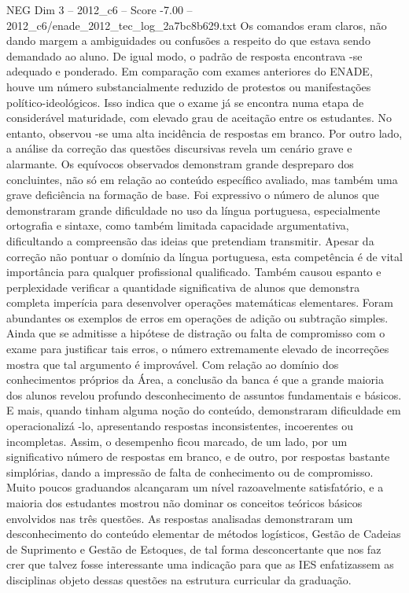 \begin{textsample}{NEG Dim 3 – 2012\_c6 – Score -7.00 – 2012\_c6/enade\_2012\_tec\_log\_2a7bc8b629.txt}
Os comandos eram claros, não dando margem a ambiguidades ou confusões a respeito do que estava sendo demandado ao aluno.
De igual modo, o padrão de resposta encontrava -se adequado e ponderado.
Em comparação com exames anteriores do ENADE, houve um número substancialmente reduzido de protestos ou manifestações político-ideológicos.
Isso indica que o exame já se encontra numa etapa de considerável maturidade, com elevado grau de aceitação entre os estudantes.
No entanto, observou -se uma alta incidência de respostas em branco.
Por outro lado, a análise da correção das questões discursivas revela um cenário grave e alarmante.
Os equívocos observados demonstram grande despreparo dos concluintes, não só em relação ao conteúdo específico avaliado, mas também uma grave deficiência na formação de base.
Foi expressivo o número de alunos que demonstraram grande dificuldade no uso da língua portuguesa, especialmente ortografia e sintaxe, como também limitada capacidade argumentativa, dificultando a compreensão das ideias que pretendiam transmitir.
Apesar da correção não pontuar o domínio da língua portuguesa, esta competência é de vital importância para qualquer profissional qualificado.
Também causou espanto e perplexidade verificar a quantidade significativa de alunos que demonstra completa imperícia para desenvolver operações matemáticas elementares.
Foram abundantes os exemplos de erros em operações de adição ou subtração simples.
Ainda que se admitisse a hipótese de distração ou falta de compromisso com o exame para justificar tais erros, o número extremamente elevado de incorreções mostra que tal argumento é improvável.
Com relação ao domínio dos conhecimentos próprios da Área, a conclusão da banca é que a grande maioria dos alunos revelou profundo desconhecimento de assuntos fundamentais e básicos.
E mais, quando tinham alguma noção do conteúdo, demonstraram dificuldade em operacionalizá -lo, apresentando respostas inconsistentes, incoerentes ou incompletas.
Assim, o desempenho ficou marcado, de um lado, por um significativo número de respostas em branco, e de outro, por respostas bastante simplórias, dando a impressão de falta de conhecimento ou de compromisso.
Muito poucos graduandos alcançaram um nível razoavelmente satisfatório, e a maioria dos estudantes mostrou não dominar os conceitos teóricos básicos envolvidos nas três questões.
As respostas analisadas demonstraram um desconhecimento do conteúdo elementar de métodos logísticos, Gestão de Cadeias de Suprimento e Gestão de Estoques, de tal forma desconcertante que nos faz crer que talvez fosse interessante uma indicação para que as IES enfatizassem as disciplinas objeto dessas questões na estrutura curricular da graduação.

\end{textsample}
